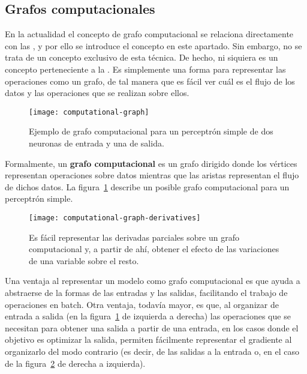 \subsection{Grafos computacionales}

En la actualidad el concepto de grafo computacional se relaciona directamente con las , y por ello se introduce el concepto en este apartado. Sin embargo, no se trata de un concepto exclusivo de esta técnica. De hecho, ni siquiera es un concepto perteneciente a la . Es simplemente una forma para representar las operaciones como un grafo, de tal manera que es fácil ver cuál es el flujo de los datos y las operaciones que se realizan sobre ellos.

\begin{figure}
	\centering
	\texttt{[image: computational-graph]}
	\caption[Ejemplo de grafo computacional]{Ejemplo de grafo computacional para un perceptrón simple de dos neuronas de entrada y una de salida.}
	\label{fig:computational-graph}
\end{figure}

Formalmente, un \textbf{grafo computacional} es un grafo dirigido donde los vértices representan operaciones sobre datos mientras que las aristas representan el flujo de dichos datos. La figura~\ref{fig:computational-graph} describe un posible grafo computacional para un perceptrón simple.

\begin{figure}[!b]
	\centering
	\texttt{[image: computational-graph-derivatives]}
	\caption[Derivadas parciales sobre un grafo computacional]{Es fácil representar las derivadas parciales sobre un grafo computacional y, a partir de ahí, obtener el efecto de las variaciones de una variable sobre el resto.}
	\label{fig:computational-graph-derivatives}
\end{figure}

Una ventaja al representar un modelo como grafo computacional es que ayuda a abstraerse de la formas de las entradas y las salidas, facilitando el trabajo de operaciones en batch. Otra ventaja, todavía mayor, es que, al organizar de entrada a salida (en la figura~\ref{fig:computational-graph} de izquierda a derecha) las operaciones que se necesitan para obtener una salida a partir de una entrada, en los casos donde el objetivo es optimizar la salida, permiten fácilmente representar el gradiente al organizarlo del modo contrario (es decir, de las salidas a la entrada o, en el caso de la figura~\ref{fig:computational-graph-derivatives} de derecha a izquierda).

